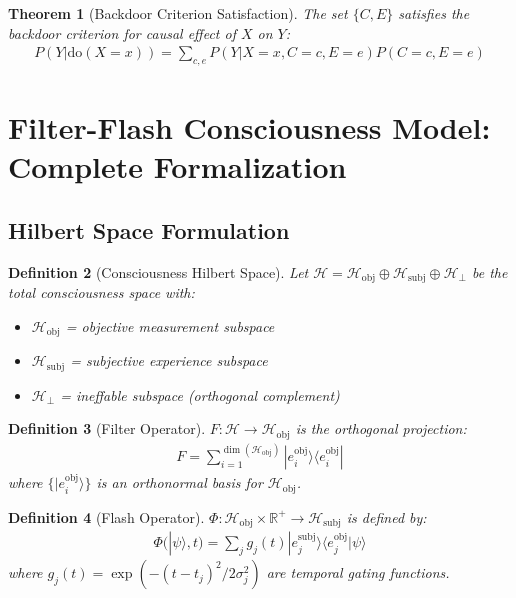 \documentclass{article}
\newtheorem{theorem}{Theorem}
\newtheorem{definition}[theorem]{Definition}
\begin{document}
\begin{theorem}[Backdoor Criterion Satisfaction]
The set $\{C, E\}$ satisfies the backdoor criterion for causal effect of $X$ on $Y$:
\begin{align}
P(Y | \text{do}(X = x)) = \sum_{c,e} P(Y | X = x, C = c, E = e) P(C = c, E = e)
\end{align}
\end{theorem}

\section{Filter-Flash Consciousness Model: Complete Formalization}

\subsection{Hilbert Space Formulation}

\begin{definition}[Consciousness Hilbert Space]
Let $\mathcal{H} = \mathcal{H}_{\text{obj}} \oplus \mathcal{H}_{\text{subj}} \oplus \mathcal{H}_{\perp}$ be the total consciousness space with:
\begin{itemize}
\item $\mathcal{H}_{\text{obj}}$ = objective measurement subspace
\item $\mathcal{H}_{\text{subj}}$ = subjective experience subspace  
\item $\mathcal{H}_{\perp}$ = ineffable subspace (orthogonal complement)
\end{itemize}
\end{definition}

\begin{definition}[Filter Operator]
$F: \mathcal{H} \rightarrow \mathcal{H}_{\text{obj}}$ is the orthogonal projection:
\begin{align}
F = \sum_{i=1}^{\dim(\mathcal{H}_{\text{obj}})} |e_i^{\text{obj}}\rangle\langle e_i^{\text{obj}}|
\end{align}
where $\{|e_i^{\text{obj}}\rangle\}$ is an orthonormal basis for $\mathcal{H}_{\text{obj}}$.
\end{definition}

\begin{definition}[Flash Operator]
$\Phi: \mathcal{H}_{\text{obj}} \times \mathbb{R}^+ \rightarrow \mathcal{H}_{\text{subj}}$ is defined by:
\begin{align}
\Phi(|\psi\rangle, t) = \sum_{j} g_j(t) |e_j^{\text{subj}}\rangle\langle e_j^{\text{obj}}|\psi\rangle
\end{align}
where $g_j(t) = \exp(-(t - t_j)^2/2\sigma_j^2)$ are temporal gating functions.
\end{definition}
\end{document}
